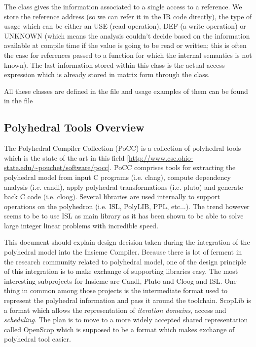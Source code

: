 The  class gives the information associated to a single access
to a reference. We store the reference address (so we can refer it in the IR
code directly), the type of usage which can be either an USE (read operation),
DEF (a write operation) or UNKNOWN (which means the analysis couldn't decide
based on the information available at compile time if the value is going to be
read or written; this is often the case for references passed to a function for
which the internal semantics is not known). The last information stored within
this class is the actual access expression which is already stored in matrix
form through the  class.

All these classes are defined in the  file
and usage examples of them can be found in the file

\subsection{Polyhedral Tools Overview}

The Polyhedral Compiler Collection (PoCC) is a collection of polyhedral tools
which is the state of the art in this field
[\url{http://www.cse.ohio-state.edu/~pouchet/software/pocc}]. PoCC comprises
tools for extracting the polyhedral model from input C programs (i.e. clang),
compute dependency analysis (i.e. candl), apply polyhedral transformations
(i.e. pluto) and generate back C code (i.e. cloog). Several libraries are
used internally to support operations on the polyhedron (i.e. ISL,
PolyLIB, PPL, etc...).  The trend however seems to be to use ISL
as main library as it has been shown to be able to solve large integer
linear problems with incredible speed. 

This document should explain design decision taken during the integration of the
polyhedral model into the Insieme Compiler. Because there is lot of ferment in
the research community related to polyhedral model, one of the design principle
of this integration is to make exchange of supporting libraries easy. The most
interesting subprojects for Insieme are Candl, Pluto and Cloog and ISL. One thing in
common among those projects is the intermediate format used to represent the
polyhedral information and pass it around the toolchain. ScopLib is a format
which allows the representation of \emph{iteration domains}, access and
\emph{scheduling}. The plan is to move to a more widely accepted shared
representation called OpenScop which is supposed to be a format which makes
exchange of polyhedral tool easier. 

